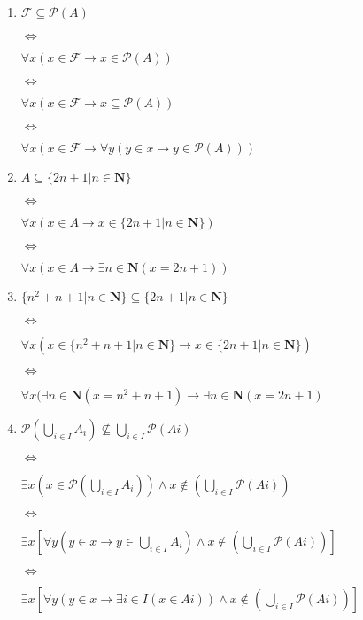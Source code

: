 \documentclass{article}
\begin{document}
\begin{enumerate}[label=(\alph*)]
    \item
    $\mathcal{F} \subseteq \mathscr{P}(A)$
    
    $\Leftrightarrow$
    
    $\forall x(x \in \mathcal{F} \rightarrow x \in \mathscr{P}(A))$
    
    $\Leftrightarrow$
    
    $\forall x(x \in \mathcal{F} \rightarrow x \subseteq \mathscr{P}(A))$
    
    $\Leftrightarrow$
    
    $\forall x(x \in \mathcal{F} \rightarrow \forall y (y \in x \rightarrow y \in \mathscr{P}(A)))$
    \item
    $A \subseteq \{ 2n + 1 | n \in \mathbf{N} \}$
    
    $\Leftrightarrow$
    
    $\forall x ( x \in A \rightarrow  x \in \{ 2n + 1 | n \in \mathbf{N} \})$
    
    $\Leftrightarrow$
    
    $\forall x ( x \in A \rightarrow  \exists n \in \mathbf{N} (x = 2n + 1))$
    \item
    $\{ n^2 + n + 1 | n \in \mathbf{N} \} \subseteq \{2n + 1 | n \in \mathbf{N} \}$
    
    $\Leftrightarrow$
    
    $\forall x (x \in \{ n^2 + n + 1 | n \in \mathbf{N} \} \rightarrow  x \in \{2n + 1 | n \in \mathbf{N} \})$
    
    $\Leftrightarrow$
    
    $\forall x (\exists n \in \mathbf{N}(x = n^2 + n + 1) \rightarrow \exists n \in \mathbf{N}(x = 2n + 1)$
    \item
    $\mathscr{P}(\bigcup_{i \in I} A_i) \nsubseteq \bigcup_{i \in I}\mathscr{P}(Ai)$
    
    $\Leftrightarrow$
    
    $\exists x(x \in \mathscr{P}(\bigcup_{i \in I} A_i)) \land x \notin (\bigcup_{i \in I}\mathscr{P}(Ai))$
    
    $\Leftrightarrow$
    
    $\exists x[\forall y (y \in x \rightarrow y \in \bigcup_{i \in I} A_i) \land x \notin (\bigcup_{i \in I}\mathscr{P}(Ai))]$
    
    $\Leftrightarrow$
    
    $\exists x[\forall y (y \in x \rightarrow \exists i \in I  (x \in Ai)) \land x \notin (\bigcup_{i \in I}\mathscr{P}(Ai))]$
    

\end{enumerate}
\end{document}
